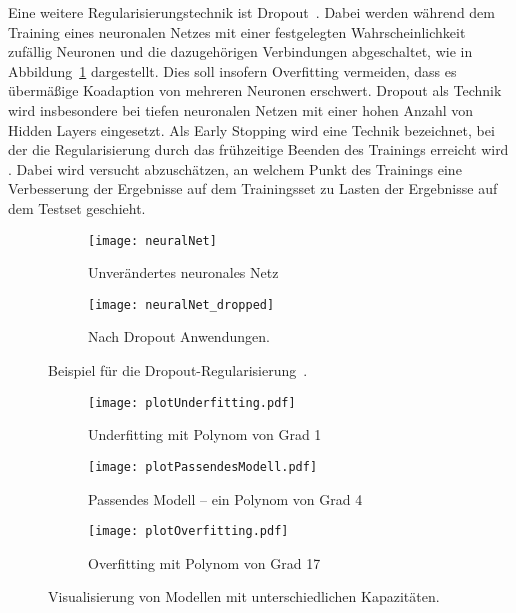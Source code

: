 
Eine weitere Regularisierungstechnik ist Dropout~\cite{JMLR:v15:srivastava14a}.
Dabei werden während dem Training eines neuronalen Netzes 
mit einer festgelegten Wahrscheinlichkeit zufällig Neuronen und die dazugehörigen Verbindungen abgeschaltet, 
wie in Abbildung~\ref{fig:dropout} dargestellt.
Dies soll insofern Overfitting vermeiden, dass es übermäßige Koadaption von mehreren Neuronen erschwert.
Dropout als Technik wird insbesondere bei tiefen neuronalen Netzen mit einer hohen Anzahl von Hidden Layers eingesetzt. 
Als Early Stopping wird eine Technik bezeichnet, bei der die Regularisierung durch das frühzeitige Beenden des Trainings erreicht wird \cite[Kapitel 7.8]{Goodfellow-et-al-2016}.
Dabei wird versucht abzuschätzen, an welchem Punkt des Trainings 
eine Verbesserung der Ergebnisse auf dem Trainingsset zu Lasten der Ergebnisse auf dem Testset geschieht.


\begin{figure}
    \centering
    \begin{subfigure}[t]{0.4\textwidth}
		\texttt{[image: neuralNet]}
		\caption{Unverändertes neuronales Netz}
    \end{subfigure}
    \begin{subfigure}[t]{0.4\textwidth}
		\texttt{[image: neuralNet\_dropped]}
		\caption{Nach Dropout Anwendungen.}
	\end{subfigure}
    \caption{Beispiel für die Dropout-Regularisierung~\cite{JMLR:v15:srivastava14a}.}
    \label{fig:dropout}
\end{figure}


\begin{figure}
    \centering
	
	\begin{subfigure}[t]{0.6\textwidth}
		\texttt{[image: plotUnderfitting.pdf]}
		\caption{Underfitting mit Polynom von Grad 1}
		\label{subfig:underfitting}
	\end{subfigure}
	\begin{subfigure}[t]{0.6\textwidth}
		\texttt{[image: plotPassendesModell.pdf]}
		\caption{Passendes Modell -- ein Polynom von Grad 4}
		\label{subfig:rightfitting}
	\end{subfigure}
	\begin{subfigure}[t]{0.6\textwidth}
        \texttt{[image: plotOverfitting.pdf]}
		\caption{Overfitting mit Polynom von Grad 17}
		\label{subfig:overfitting}
	\end{subfigure}
	\caption{Visualisierung von Modellen mit unterschiedlichen Kapazitäten.}
	\label{fig:capacity}
\end{figure}


